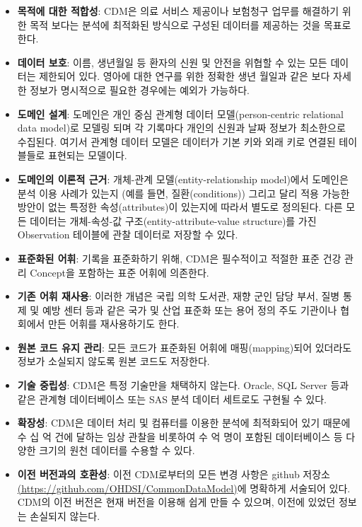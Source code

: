 \documentclass[11pt]{book}
\providecommand{\tightlist}{%
  \setlength{\itemsep}{0pt}\setlength{\parskip}{0pt}}
\theoremstyle{definition}
\theoremstyle{definition}
\theoremstyle{definition}
\theoremstyle{remark}
\begin{document}
\begin{itemize}
\tightlist
\item
  \textbf{목적에 대한 적합성}: CDM은 의료 서비스 제공이나 보험청구
  업무를 해결하기 위한 목적 보다는 분석에 최적화된 방식으로 구성된
  데이터를 제공하는 것을 목표로 한다.
\item
  \textbf{데이터 보호}: 이름, 생년월일 등 환자의 신원 및 안전을 위협할
  수 있는 모든 데이터는 제한되어 있다. 영아에 대한 연구를 위한 정확한
  생년 월일과 같은 보다 자세한 정보가 명시적으로 필요한 경우에는 예외가
  가능하다.
\item
  \textbf{도메인 설계}: 도메인은 개인 중심 관계형 데이터
  모델(person-centric relational data model)로 모델링 되며 각 기록마다
  개인의 신원과 날짜 정보가 최소한으로 수집된다. 여기서 관계형 데이터
  모델은 데이터가 기본 키와 외래 키로 연결된 테이블들로 표현되는
  모델이다.
\item
  \textbf{도메인의 이론적 근거}: 개체-관계 모델(entity-relationship
  model)에서 도메인은 분석 이용 사례가 있는지 (예를 들면,
  질환(conditions)) 그리고 달리 적용 가능한 방안이 없는 특정한
  속성(attributes)이 있는지에 따라서 별도로 정의된다. 다른 모든 데이터는
  개체-속성-값 구조(entity-attribute-value structure)를 가진 Observation
  테이블에 관찰 데이터로 저장할 수 있다.
\item
  \textbf{표준화된 어휘}: 기록을 표준화하기 위해, CDM은 필수적이고
  적절한 표준 건강 관리 Concept을 포함하는 표준 어휘에 의존한다.
\item
  \textbf{기존 어휘 재사용}: 이러한 개념은 국립 의학 도서관, 재향 군인
  담당 부서, 질병 통제 및 예방 센터 등과 같은 국가 및 산업 표준화 또는
  용어 정의 주도 기관이나 협회에서 만든 어휘를 재사용하기도 한다.
\item
  \textbf{원본 코드 유지 관리}: 모든 코드가 표준화된 어휘에
  매핑(mapping)되어 있더라도 정보가 소실되지 않도록 원본 코드도
  저장한다. 
\item
  \textbf{기술 중립성}: CDM은 특정 기술만을 채택하지 않는다. Oracle, SQL
  Server 등과 같은 관계형 데이터베이스 또는 SAS 분석 데이터 세트로도
  구현될 수 있다. 
\item
  \textbf{확장성}: CDM은 데이터 처리 및 컴퓨터를 이용한 분석에
  최적화되어 있기 때문에 수 십 억 건에 달하는 임상 관찰을 비롯하여 수 억
  명이 포함된 데이터베이스 등 다양한 크기의 원천 데이터를 수용할 수
  있다. 
\item
  \textbf{이전 버전과의 호환성}: 이전 CDM로부터의 모든 변경 사항은
  github 저장소
  \href{https://github.com/OHDSI/CommonDataModel}{(https://github.com/OHDSI/CommonDataModel)}에
  명확하게 서술되어 있다. CDM의 이전 버전은 현재 버전을 이용해 쉽게 만들
  수 있으며, 이전에 있었던 정보는 손실되지 않는다.
\end{itemize}
\end{document}
